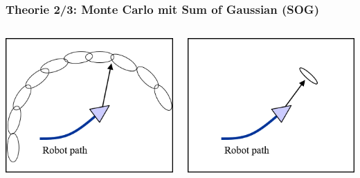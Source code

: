 \documentclass{beamer}
\begin{document}
%
%
%
\begin{frame}
	\frametitle{Theorie 2/3: Monte Carlo mit Sum of Gaussian (SOG)}
	\begin{columns}
			\centering
			\includegraphics[scale=0.5]{blanco2008efficient_fig10a}		
		
			\centering
			\includegraphics[scale=0.5]{blanco2008efficient_fig10b}
	\end{columns}
\end{frame}
\end{document}

